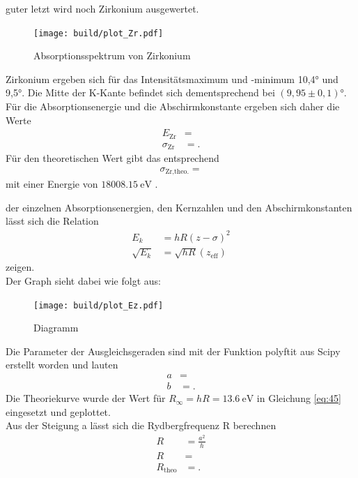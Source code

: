 \justifying guter letzt wird noch Zirkonium ausgewertet.


\begin{figure}[H]
    \centering
    \texttt{[image: build/plot\_Zr.pdf]}
    \caption{Absorptionsspektrum von Zirkonium\cite{matplotlib}}
    \label{fig:9}
\end{figure}
\justifying Zirkonium ergeben sich für das Intensitätsmaximum und -minimum
10,4° und 9,5°.
Die Mitte der K-Kante befindet sich dementsprechend bei $(9,95\pm 0,1)°$.
Für die Absorptionsenergie und die Abschirmkonstante ergeben sich daher
die Werte
\begin{align}
    E_{\text{Zr}} &= \text{} \label{eq:42} \\
    \sigma _{\text{Zr}} &= \text{} \label{eq:43}.
\end{align}
Für den theoretischen Wert gibt das entsprechend
\begin{align}
    \sigma _{\text{Zr,theo.}} = \text{} \label{eq:44}
\end{align}
mit einer Energie von $\SI{18008.15}{\electronvolt} $ \cite{NIST}.


\justifying der einzelnen Absorptionsenergien, den Kernzahlen und den Abschirmkonstanten
lässt sich die Relation \cite{V602}
\begin{align}
    E_k &= hR (z-\sigma)^2 \label{eq:45}\\
    \sqrt{E_k}&=\sqrt{hR} (z_{\text{eff}} ) \label{eq:46}
\end{align}
zeigen.\\
Der Graph sieht dabei wie folgt aus:
\begin{figure}[H]
    \centering
    \texttt{[image: build/plot\_Ez.pdf]}
    \caption{ Diagramm\cite{matplotlib}}
    \label{fig:10}
\end{figure}
Die Parameter der Ausgleichsgeraden sind mit der Funktion polyftit aus Scipy erstellt
worden und lauten
\begin{align}
    a &= \text{} \label{eq:47} \\
    b &= \text{} \label{eq:48}.
\end{align}
Die Theoriekurve wurde der Wert für $R_{\infty}=hR=\SI{13.6}{\electronvolt} $ in 
Gleichung \eqref{eq:45} eingesetzt und geplottet.\\
Aus der Steigung a lässt sich die Rydbergfrequenz R berechnen
\begin{align}
    R&=\frac{a^2}{h} \label{eq:49}\\
    R&= \text{} \label{eq:50}\\
    R_{\text{theo}}&= \text{} \label{eq:51}.
\end{align}

